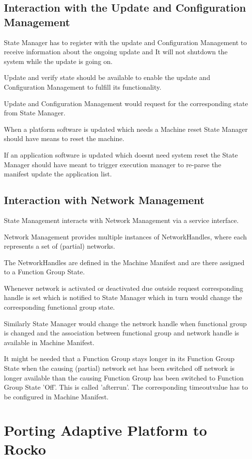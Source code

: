 \subsection*{Interaction with the Update and Configuration Management}


\begin{DoxyItemize}
\item State Manager has to register with the update and Configuration Management to receive information about the ongoing update and It will not shutdown the system while the update is going on.
\item Update and verify state should be available to enable the update and Configuration Management to fulfill its functionality.
\item Update and Configuration Management would request for the corresponding state from State Manager.
\item When a platform software is updated which needs a Machine reset State Manager should have means to reset the machine.
\item If an application software is updated which doesn\textquotesingle{}t need system reset the State Manager should have meant to trigger execution manager to re-\/parse the manifest update the application list.
\end{DoxyItemize}

\subsection*{Interaction with Network Management}


\begin{DoxyItemize}
\item State Management interacts with Network Management via a service interface.
\item Network Management provides multiple instances of Network\+Handles, where each represents a set of (partial) networks.
\item The Network\+Handles are defined in the Machine Manifest and are there assigned to a Function Group State.
\item Whenever network is activated or deactivated due outside request corresponding handle is set which is notified to State Manager which in turn would change the corresponding functional group state.
\item Similarly State Manager would change the network handle when functional group is changed and the association between functional group and network handle is available in Machine Manifest.
\item It might be needed that a Function Group stays longer in its Function Group State when the causing (partial) network set has been switched off network is longer available than the causing Function Group has been switched to Function Group State ’\+Off’. This is called ’afterrun’. The corresponding timeoutvalue has to be configured in Machine Manifest. 
\end{DoxyItemize}\hypertarget{Porting_rocko}{}\section{Porting Adaptive Platform to Rocko}\label{Porting_rocko}
